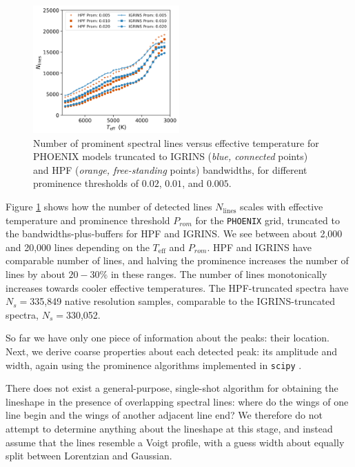 \documentclass[modern]{aastex631}
\begin{document}
\begin{figure}[hbt!]
  \centering
  \includegraphics[width=0.5\textwidth]{figures/N_lines_vs_Teff_prom.png}
  \caption{Number of prominent spectral lines versus effective temperature for PHOENIX models truncated to IGRINS (\emph{blue, connected} points) and HPF (\emph{orange, free-standing} points) bandwidths, for different prominence thresholds of $0.02$, $0.01$, and $0.005$.}
  \label{fig_Nlines_vs_teff}
\end{figure}


Figure \ref{fig_Nlines_vs_teff} shows how the number of detected lines $N_{\mathrm{lines}}$ scales with effective temperature and prominence threshold $P_{rom}$ for the \texttt{PHOENIX} grid, truncated to the bandwidths-plus-buffers for HPF and IGRINS.  We see between about 2,000 and 20,000 lines depending on the $T_{\mathrm{eff}}$ and $P_{rom}$.  HPF and IGRINS have comparable number of lines, and halving the prominence increases the number of lines by about $20-30\%$ in these ranges.  The number of lines monotonically increases towards cooler effective temperatures.
The HPF-truncated spectra have $N_s=$335,849 native resolution samples, comparable to the IGRINS-truncated spectra, $N_s=$330,052.

So far we have only one piece of information about the peaks: their location.  Next, we derive coarse properties about each detected peak: its amplitude and width, again using the prominence algorithms implemented in \texttt{scipy} \citep{2020SciPy-NMeth}.

There does not exist a general-purpose, single-shot algorithm for obtaining the lineshape in the presence of overlapping spectral lines: where do the wings of one line begin and the wings of another adjacent line end?  We therefore do not attempt to determine anything about the lineshape at this stage, and instead assume that the lines resemble a Voigt profile, with a guess width about equally split between Lorentzian and Gaussian.
\end{document}
